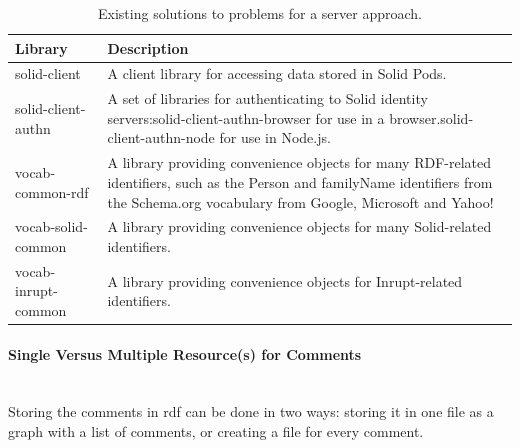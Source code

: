 \begin{table}[h!]
    \centering
    \begin{tabular}{| l | p{11cm} |} 
    \hline
     Library & Description \\
     \hline
      solid-client & A client library for accessing data stored in Solid Pods.  \\
      \hline
      solid-client-authn & A set of libraries for authenticating to Solid identity servers:solid-client-authn-browser for use in a browser.solid-client-authn-node for use in Node.js.  \\
      \hline
      vocab-common-rdf & A library providing convenience objects for many RDF-related identifiers, such as the Person and familyName identifiers from the Schema.org vocabulary from Google, Microsoft and Yahoo!  \\
      \hline
      vocab-solid-common & A library providing convenience objects for many Solid-related identifiers.  \\
      \hline
      vocab-inrupt-common & A library providing convenience objects for Inrupt-related identifiers.  \\
      \hline
    \end{tabular}
    \vspace{0.75cm}
    \caption{Existing solutions to problems for a server approach.}
    \label{table:4}
\end{table}
\vspace{0.5cm}
\paragraph{Single Versus Multiple Resource(s) for Comments}\mbox{}\\

Storing the comments in \gls{rdf} can be done in two ways: storing it in one file as a graph with a list of comments, or creating a file for every comment.


